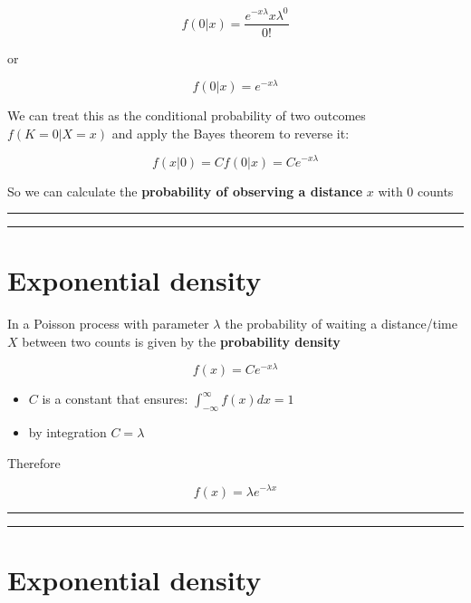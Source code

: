 \documentclass[
]{book}
\begin{document}
\[f(0|x)=\frac{e^{-x\lambda}x\lambda^0}{0!}\]

or

\[f(0|x)=e^{-x\lambda}\]

We can treat this as the conditional probability of two outcomes \(f(K=0|X=x)\) and apply the Bayes theorem to reverse it:

\[f(x|0)=C f(0|x)=C e^{-x\lambda}\]

So we can calculate the \textbf{probability of observing a distance} \(x\) with \(0\) counts

\begin{center}\rule{0.5\linewidth}{0.5pt}\end{center}

\begin{center}\rule{0.5\linewidth}{0.5pt}\end{center}

\hypertarget{exponential-density-2}{%
\section{Exponential density}\label{exponential-density-2}}

In a Poisson process with parameter \(\lambda\) the probability of waiting a distance/time \(X\) between two counts is given by the \textbf{probability density}

\[f(x)= C e^{-x\lambda}\]

\begin{itemize}
\item
  \(C\) is a constant that ensures: \(\int_{-\infty}^{\infty} f(x) dx =1\)
\item
  by integration \(C=\lambda\)
\end{itemize}

Therefore

\[f(x)=\lambda e^{-\lambda x}\]

\begin{center}\rule{0.5\linewidth}{0.5pt}\end{center}

\begin{center}\rule{0.5\linewidth}{0.5pt}\end{center}

\hypertarget{exponential-density-3}{%
\section{Exponential density}\label{exponential-density-3}}
\end{document}
